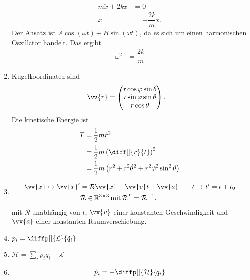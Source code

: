\documentclass[a4paper,12pt]{article}
\numberwithin{equation}{section}
\begin{document}
\begin{enumerate}[label=\arabic*.]
\begin{align*}
                        m\ddot{x}+2kx&=0\\
                        \ddot{x}&=-\dfrac{2k}{m}x
                .\end{align*} 
                Der Ansatz ist $A\cos \left(\omega t\right)+B\sin \left(\omega t\right)$, da es sich um einen harmonischen Oszillator handelt. Das ergibt
                \begin{align*} 
                        \omega ^2&=\dfrac{2k}{m}
                \end{align*} 
        \item Kugelkoordinaten sind
                \begin{align*} 
                        \vv{r}&=\begin{pmatrix}
                                r\cos \varphi \sin \theta \\
                                r\sin \varphi \sin \theta  \\
                                r\cos \theta 
                        \end{pmatrix}
                .\end{align*} 
                Die kinetische Energie ist
                \begin{align*} 
                        T&=\dfrac{1}{2}m\dot{r}^2\\
                         &=\dfrac{1}{2}m\left(\diff[]{r}{t}\right)^2\\
                         &=\dfrac{1}{2}m\left(\dot{r}^2+r^2\dot{\theta }^2+r^2\dot{\varphi }^2\sin ^2\theta \right)
                \end{align*} 
        \item \begin{align*} 
                        \vv{x}\mapsto \vv{x}'&=\mathcal{R}\vv{x}+\vv{v}t+\vv{a}\qquad t\mapsto t'=t+t_0\\
                                             &\mathcal{R} \in \mathbb{R}^{3\times 3}\,\text{mit}\,\mathcal{R}^T=\mathcal{R}^{-1}
        ,\end{align*} 
        mit $\mathcal{R}$ unabhängig von $t$, $\vv{v}$ einer konstanten Geschwindigkeit und $\vv{a}$ einer konstanten Raumverschiebung.
        \item $p_i=\diffp[]{\mathcal{L}}{\dot{q}_i}$ 
        \item $\mathcal{H}=\sum_{i}^{}p_i\dot{q}_i-\mathcal{L}$ 
        \item \begin{align*} 
                        \dot{p}_i&=-\diffp[]{\mathcal{H}}{q_i}\\

\end{align*}
\end{enumerate}
\end{document}
